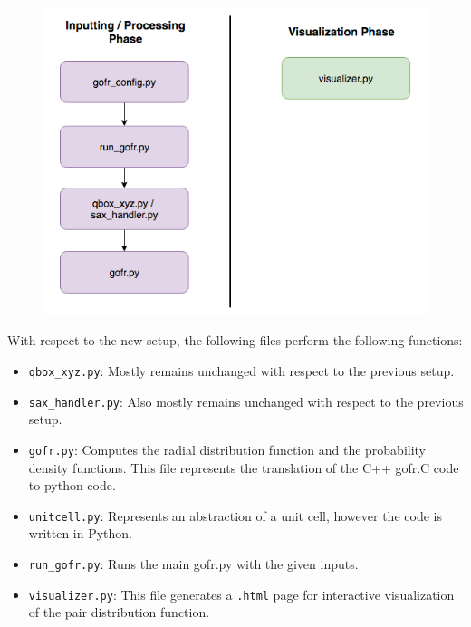 \begin{figure}[h]
\centering
\includegraphics[scale=0.60]{images/new_pipeline}\newline
\end{figure}

With respect to the new setup, the following files perform the following functions: 

\begin{itemize}
        
    \item \verb|qbox_xyz.py|: Mostly remains unchanged with respect to the previous setup.
    
    \item \verb|sax_handler.py|: Also mostly remains unchanged with respect to the previous setup.

    \item \verb|gofr.py|: Computes the radial distribution function and the probability density functions. This file represents the translation of the C++ gofr.C code to python code. 
    
    \item \verb|unitcell.py|: Represents an abstraction of a unit cell, however the code is written in Python.
    
    \item \verb|run_gofr.py|: Runs the main gofr.py with the given inputs.

    \item \verb|visualizer.py|: This file generates a \verb|.html| page for interactive visualization of the pair distribution function.
    
\end{itemize}



